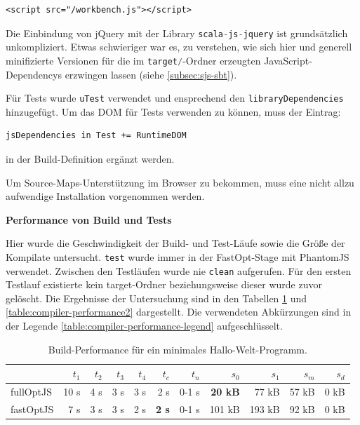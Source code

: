 \documentclass[a4paper, 12pt, hidelinks, listof=totoc, listoftables=totoc, bibliography=totoc]{scrreprt}
\newcommand{\code}[1]{\lstinline[language=Scala, style=inline]|#1|}
\newcommand{\MyMiniSec}[1]{\rmfamily\fontsize{12}{15}\selectfont
	\vspace{7pt}\textbf{#1} %
}
\begin{document}
\begin{lstlisting}[language=HTML5, style=snippet]
<script src="/workbench.js"></script>
\end{lstlisting}

Die Einbindung von jQuery mit der Library \code{scala-js-jquery} ist grundsätzlich unkompliziert. Etwas schwieriger war es, zu verstehen, wie sich hier und generell minifizierte Versionen für die im \code{target/}-Ordner erzeugten JavaScript-Dependencys erzwingen lassen (siehe \ref{subsec:sjs-sbt}).

Für Tests wurde \code{uTest} verwendet und ensprechend den \code{libraryDependencies} hinzugefügt. Um das \ac{DOM} für Tests verwenden zu können, muss der Eintrag:

\begin{lstlisting}[style=snippet]
jsDependencies in Test += RuntimeDOM
\end{lstlisting}
in der Build-Definition ergänzt werden.

Um Source-Maps-Unterstützung im Browser zu bekommen, muss eine nicht allzu aufwendige Installation vorgenommen werden.


\MyMiniSec{Performance von Build und Tests}

Hier wurde die Geschwindigkeit der Build- und Test-Läufe sowie die Größe der Kompilate untersucht. \code{test} wurde immer in der FastOpt-Stage mit PhantomJS verwendet. Zwischen den Testläufen wurde nie \code{clean} aufgerufen. Für den ersten Testlauf existierte kein target-Ordner beziehungsweise dieser wurde zuvor gelöscht. Die Ergebnisse der Untersuchung sind in den Tabellen \ref{table:compiler-performance1} und \ref{table:compiler-performance2} dargestellt. Die verwendeten Abkürzungen sind in der Legende \ref{table:compiler-performance-legend} aufgeschlüsselt.

\medskip

\begin{table}[!h]
\begin{tabular}{|l|r|r|r|r|r|r||r|r|r|r|}
\hline           & $t_1$ & $t_2$ & $t_3$ & $t_4$ & $t_c$         & $t_n$ & $s_0$          & $s_1$  & $s_m$ & $s_d$ \\ 
\hline fullOptJS & 10 s  &  4 s  &  3 s  &  3 s  &          2 s  & 0-1 s & \textbf{20 kB} &  77 kB & 57 kB &  0 kB \\ 
\hline fastOptJS &  7 s  &  3 s  &  3 s  &  2 s  &  \textbf{2 s} & 0-1 s &        101 kB  & 193 kB & 92 kB &  0 kB \\ 
\hline 
\end{tabular} 
\caption{Build-Performance für ein minimales Hallo-Welt-Programm.}
\label{table:compiler-performance1}
\end{table}
\end{document}
